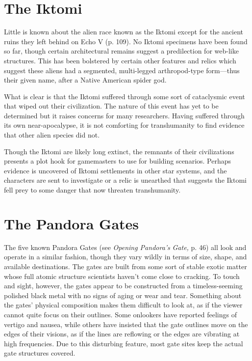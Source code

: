 \section{The Iktomi} 

Little is known about the alien race known as the Iktomi except for the ancient ruins they left behind on Echo V (p. 109). No Iktomi specimens have been found so far, though certain architectural remains suggest a predilection for web-like structures. This has been bolstered by certain other features and relics which suggest these aliens had a segmented, multi-legged arthropod-type form—thus their given name, after a Native American spider god. 

What is clear is that the Iktomi suffered through some sort of cataclysmic event that wiped out their civilization. The nature of this event has yet to be determined but it raises concerns for many researchers. Having suffered through its own near-apocalypse, it is not comforting for transhumanity to find evidence that other alien species did not. 

Though the Iktomi are likely long extinct, the remnants of their civilizations presents a plot hook for gamemasters to use for building scenarios. Perhaps evidence is uncovered of Iktomi settlements in other star systems, and the characters are sent to investigate or a relic is unearthed that suggests the Iktomi fell prey to some danger that now threaten transhumanity. 

\section{The Pandora Gates} 

The five known Pandora Gates (see \textit{Opening Pandora's } \textit{Gate,} p. 46) all look and operate in a similar fashion, though they vary wildly in terms of size, shape, and available destinations. The gates are built from some sort of stable exotic matter whose full atomic structure scientists haven't come close to cracking. To touch and sight, however, the gates appear to be constructed from a timeless-seeming polished black metal with no signs of aging or wear and tear. Something about the gates' physical composition makes them difficult to look at, as if the viewer cannot quite focus on their outlines. Some onlookers have reported feelings of vertigo and nausea, while others have insisted that the gate outlines move on the edges of their visions, as if the lines are reflowing or the edges are vibrating at high frequencies. Due to this disturbing feature, most gate sites keep the actual gate structures covered. 

